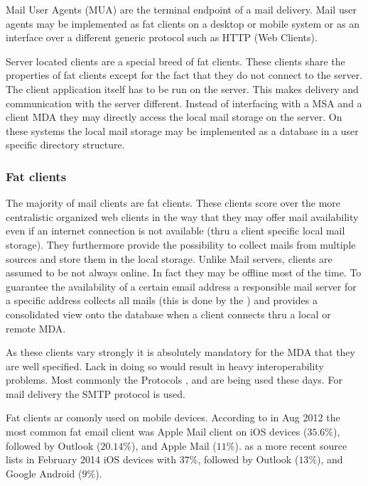 Mail User Agents (MUA) are the terminal endpoint of a mail delivery. Mail user agents may be implemented as fat clients on a desktop or mobile system or as an interface over a different generic protocol such as HTTP (Web Clients). \par

Server located clients are a special breed of fat clients. These clients share the properties of fat clients except for the fact that they do not connect to the server. The client application itself has to be run on the server. This makes delivery and communication with the server different. Instead of interfacing with a MSA and a client MDA they may directly access the local mail storage on the server. On these systems the local mail storage may be implemented as a database in a user specific directory structure.

\subsubsection{Fat clients}
The majority of mail clients are fat clients. These clients score over the more centralistic organized web clients in the way that they may offer mail availability even if an internet connection is not available (thru a client specific local mail storage). They furthermore provide the possibility to collect mails from multiple sources and store them in the local storage. Unlike Mail servers, clients are assumed to be not always online. In fact they may be offline most of the time. To guarantee the availability of a certain email address a responsible mail server for a specific address collects all mails (this is done by the ) and provides a consolidated view onto the database when a client connects thru a local or remote MDA.\par

As these clients vary strongly it is absolutely mandatory for the MDA that they are well specified. Lack in doing so would result in heavy interoperability problems. Most commonly the Protocols ,  and  are being used these days. For mail delivery the SMTP protocol is used. \par

Fat clients ar comonly used on mobile devices. According to  \cite{clientDistribution} in Aug 2012 the most common fat email client was Apple Mail client on iOS devices ($35.6\%$), followed by Outlook ($20.14\%$), and Apple Mail ($11\%$). \cite{clientDistribution2} as a more recent source lists in February 2014 iOS devices with $37\%$, followed by Outlook ($13\%$), and  Google Android ($9\%$).

